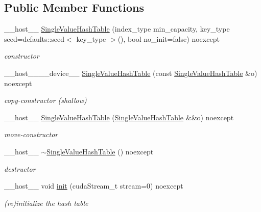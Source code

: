 \subsection*{Public Member Functions}
\begin{DoxyCompactItemize}
\item 
\+\_\+\+\_\+host\+\_\+\+\_\+ \hyperlink{classwarpcore_1_1SingleValueHashTable_a126bd7d04488b3abeb1b230bd04963b2}{Single\+Value\+Hash\+Table} (index\+\_\+type min\+\_\+capacity, key\+\_\+type seed=defaults\+::seed$<$ key\+\_\+type $>$(), bool no\+\_\+init=false) noexcept
\begin{DoxyCompactList}\small\item\em constructor \end{DoxyCompactList}\item 
\+\_\+\+\_\+host\+\_\+\+\_\+\+\_\+\+\_\+device\+\_\+\+\_\+ \hyperlink{classwarpcore_1_1SingleValueHashTable_a59e29f9fdfb395cca5838822b55488e0}{Single\+Value\+Hash\+Table} (const \hyperlink{classwarpcore_1_1SingleValueHashTable}{Single\+Value\+Hash\+Table} \&o) noexcept
\begin{DoxyCompactList}\small\item\em copy-\/constructor (shallow) \end{DoxyCompactList}\item 
\+\_\+\+\_\+host\+\_\+\+\_\+ \hyperlink{classwarpcore_1_1SingleValueHashTable_a8dcaffe8bc23ec0fdd2cd45d3033ddeb}{Single\+Value\+Hash\+Table} (\hyperlink{classwarpcore_1_1SingleValueHashTable}{Single\+Value\+Hash\+Table} \&\&o) noexcept
\begin{DoxyCompactList}\small\item\em move-\/constructor \end{DoxyCompactList}\item 
\mbox{\label{classwarpcore_1_1SingleValueHashTable_a71153a36251ecf2609fb868b02c2d616}} 
\+\_\+\+\_\+host\+\_\+\+\_\+ \hyperlink{classwarpcore_1_1SingleValueHashTable_a71153a36251ecf2609fb868b02c2d616}{$\sim$\+Single\+Value\+Hash\+Table} () noexcept
\begin{DoxyCompactList}\small\item\em destructor \end{DoxyCompactList}\item 
\+\_\+\+\_\+host\+\_\+\+\_\+ void \hyperlink{classwarpcore_1_1SingleValueHashTable_a6684c95a43e912c1b0e41a6e81afb641}{init} (cuda\+Stream\+\_\+t stream=0) noexcept
\begin{DoxyCompactList}\small\item\em (re)initialize the hash table \end{DoxyCompactList}\item 

\end{DoxyCompactItemize}
